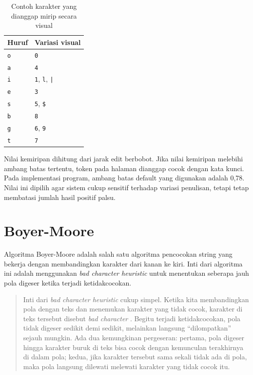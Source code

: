 \begin{table}[H]
\centering
\caption{Contoh karakter yang dianggap mirip secara visual}
\label{tab:visual-substitution}
\begin{tabular}{|p{4cm}|p{8cm}|}
\hline
\textbf{Huruf} & \textbf{Variasi visual} \\
\hline
\texttt{o} & \texttt{0} \\
\hline
\texttt{a} & \texttt{4} \\
\hline
\texttt{i} & \texttt{1}, \texttt{l}, \texttt{|} \\
\hline
\texttt{e} & \texttt{3} \\
\hline
\texttt{s} & \texttt{5}, \texttt{\$} \\
\hline
\texttt{b} & \texttt{8} \\
\hline
\texttt{g} & \texttt{6}, \texttt{9} \\
\hline
\texttt{t} & \texttt{7} \\
\hline
\end{tabular}
\end{table}

Nilai kemiripan dihitung dari jarak edit berbobot. Jika nilai kemiripan
melebihi ambang batas tertentu, token pada halaman dianggap cocok dengan kata
kunci. Pada implementasi program, ambang batas default yang digunakan adalah
0,78. Nilai ini dipilih agar sistem cukup sensitif terhadap variasi penulisan,
tetapi tetap membatasi jumlah hasil positif palsu.

\section{Boyer-Moore}

Algoritma Boyer-Moore adalah salah satu algoritma pencocokan string yang
bekerja dengan membandingkan karakter dari kanan ke kiri. Inti dari algoritma
ini adalah menggunakan \textit{bad character heuristic} untuk menentukan seberapa
jauh pola digeser ketika terjadi ketidakcocokan.

\begin{quotation}
Inti dari \textit{bad character heuristic} cukup simpel. Ketika kita
membandingkan pola dengan teks dan menemukan karakter yang tidak cocok, karakter
di teks tersebut disebut \textit{bad character} . Begitu
terjadi ketidakcocokan, pola tidak digeser sedikit demi sedikit, melainkan
langsung ``dilompatkan'' sejauh mungkin. Ada dua kemungkinan pergeseran:
pertama, pola digeser hingga karakter buruk di teks bisa cocok dengan
kemunculan terakhirnya di dalam pola; kedua, jika karakter tersebut sama
sekali tidak ada di pola, maka pola langsung dilewati melewati karakter yang
tidak cocok itu.
\cite{geeksforgeeks_boyer_moore}
\end{quotation}


